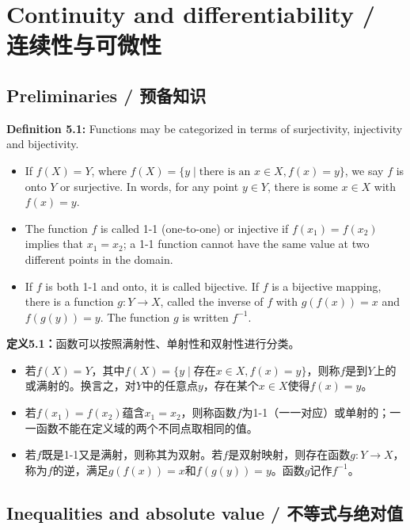 \section{Continuity and differentiability / 连续性与可微性}

\subsection{Preliminaries / 预备知识}

\begin{original}
\textbf{Definition 5.1:} Functions may be categorized in terms of surjectivity, injectivity and bijectivity.
\begin{itemize}
\item If $f(X) = Y$, where $f(X) = \{y \mid \text{there is an } x \in X, f(x) = y\}$, we say $f$ is onto $Y$ or surjective. In words, for any point $y \in Y$, there is some $x \in X$ with $f(x) = y$.
\item The function $f$ is called 1-1 (one-to-one) or injective if $f(x_1) = f(x_2)$ implies that $x_1 = x_2$; a 1-1 function cannot have the same value at two different points in the domain.
\item If $f$ is both 1-1 and onto, it is called bijective. If $f$ is a bijective mapping, there is a function $g: Y \to X$, called the inverse of $f$ with $g(f(x)) = x$ and $f(g(y)) = y$. The function $g$ is written $f^{-1}$.
\end{itemize}
\end{original}
\begin{translation}
\textbf{定义5.1：}函数可以按照满射性、单射性和双射性进行分类。
\begin{itemize}
\item 若$f(X) = Y$，其中$f(X) = \{y \mid \text{存在} x \in X, f(x) = y\}$，则称$f$是到$Y$上的或满射的。换言之，对$Y$中的任意点$y$，存在某个$x \in X$使得$f(x) = y$。
\item 若$f(x_1) = f(x_2)$蕴含$x_1 = x_2$，则称函数$f$为1-1（一一对应）或单射的；一一函数不能在定义域的两个不同点取相同的值。
\item 若$f$既是1-1又是满射，则称其为双射。若$f$是双射映射，则存在函数$g: Y \to X$，称为$f$的逆，满足$g(f(x)) = x$和$f(g(y)) = y$。函数$g$记作$f^{-1}$。
\end{itemize}
\end{translation}

\subsection{Inequalities and absolute value / 不等式与绝对值}

